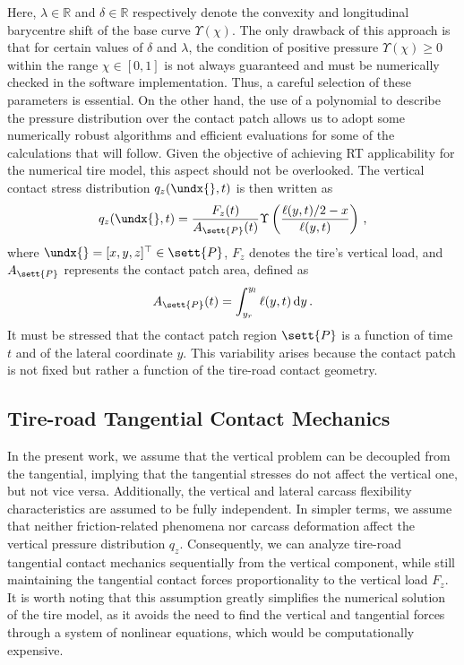 %
Here, $\lambda \in \mathbb{R}$ and $\delta \in \mathbb{R}$ respectively denote the convexity and longitudinal barycentre shift of the base curve $\Upsilon(\chi)$. The only drawback of this approach is that for certain values of $\delta$ and $\lambda$, the condition of positive pressure $\Upsilon(\chi) \ge 0$ within the range $\chi \in [0,1]$ is not always guaranteed and must be numerically checked in the software implementation. Thus, a careful selection of these parameters is essential. On the other hand, the use of a polynomial to describe the pressure distribution over the contact patch allows us to adopt some numerically robust algorithms and efficient evaluations for some of the calculations that will follow. Given the objective of achieving \ac{RT} applicability for the numerical tire model, this aspect should not be overlooked. The vertical contact stress distribution $q_z(\undx{},t)$ is then written as
%
\begin{equation}
  q_z(\undx{},t) = \dfrac{F_z(t)}{A_\sett{P}(t)}\Upsilon\left(\dfrac{\ell(y,t)/2-x}{\ell(y,t)}\right) \, \text{,} \\
  \label{app3:eq:vertical_stress}
\end{equation}
%
where $\undx{} = [x,y,z]^\top \in \sett{P}$, $F_z$ denotes the tire's vertical load, and $A_\sett{P}$ represents the contact patch area, defined as
%
\begin{equation*}
  A_\sett{P}(t) = \displaystyle\int_{y_r}^{y_l} \ell(y,t)\,\mathrm{d}y \, \text{.}
\end{equation*}
%
It must be stressed that the contact patch region $\sett{P}$ is a function of time $t$ and of the lateral coordinate $y$. This variability arises because the contact patch is not fixed but rather a function of the tire-road contact geometry.


\subsection{Tire-road Tangential Contact Mechanics}
\label{app3:sec:tangential_contact}

In the present work, we assume that the vertical problem can be decoupled from the tangential, implying that the tangential stresses do not affect the vertical one, but not vice versa. Additionally, the vertical and lateral carcass flexibility characteristics are assumed to be fully independent. In simpler terms, we assume that neither friction-related phenomena nor carcass deformation affect the vertical pressure distribution $q_z$. Consequently, we can analyze tire-road tangential contact mechanics sequentially from the vertical component, while still maintaining the tangential contact forces proportionality to the vertical load $F_z$. It is worth noting that this assumption greatly simplifies the numerical solution of the tire model, as it avoids the need to find the vertical and tangential forces through a system of nonlinear equations, which would be computationally expensive.

